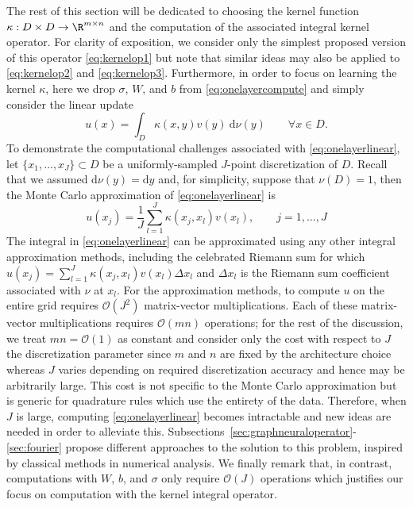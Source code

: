 The rest of this section will be dedicated to choosing the kernel function \(\kappa : D \times D \to \R^{m \times n}\) and the computation of the associated integral kernel operator. For clarity of exposition, we consider only the simplest proposed version of this operator \eqref{eq:kernelop1} but note that similar ideas may also be applied to \eqref{eq:kernelop2} and \eqref{eq:kernelop3}. Furthermore, in order to focus on learning the kernel $\kappa$, here we drop \(\sigma\), \(W\), and \(b\) from \eqref{eq:onelayercompute} and simply consider the linear update
\begin{equation}
    \label{eq:onelayerlinear}
    u(x) = \int_D \kappa(x,y) v(y) \: \text{d} \nu(y) \qquad \forall x \in D.
\end{equation}
To demonstrate the computational challenges associated with \eqref{eq:onelayerlinear}, let \(\{x_1,\dots,x_J\} \subset D\) be a uniformly-sampled \(J\)-point discretization of \(D\). Recall that we assumed \(\text{d} \nu(y) = \text{d} y\) and, for simplicity, suppose that \(\nu(D)=1\), then the Monte Carlo approximation of \eqref{eq:onelayerlinear} is
%
\begin{equation}
    \label{eq:onelayerlinear_MC}
    u(x_j) = \frac{1}{J} \sum_{l=1}^J \kappa(x_j, x_l) v(x_l), \qquad j=1,\dots,J
\end{equation}
The integral in \eqref{eq:onelayerlinear} can be approximated using any other integral approximation methods, including the celebrated Riemann sum for which $u(x_j) = \sum_{l=1}^J \kappa(x_j, x_l) v(x_l)\Delta x_l$ and $\Delta x_l$ is the Riemann sum coefficient associated with $\nu$ at $x_l$. For the approximation methods, to compute \(u\) on the entire grid requires \(\mathcal{O}(J^2)\) matrix-vector multiplications. Each of these matrix-vector multiplications requires \(\mathcal{O}(mn)\) operations; for the rest of the discussion, we treat \(mn = \mathcal{O}(1)\) as constant and consider only the cost with respect to \(J\) the discretization parameter since $m$ and $n$ are fixed by
the architecture choice whereas $J$ varies depending on
required discretization accuracy and hence may be arbitrarily
large. This cost is not specific to the Monte Carlo approximation but is generic for quadrature rules which use the entirety of the data. Therefore, when \(J\) is large, computing \eqref{eq:onelayerlinear} becomes intractable and new ideas are needed in order to alleviate this. Subsections~\ref{sec:graphneuraloperator}-\ref{sec:fourier} propose different approaches to the solution to this problem,
inspired by classical methods in numerical analysis.  We finally remark that, in contrast, computations with \(W\), \(b\), and \(\sigma\) only require \(\mathcal{O}(J)\) operations which justifies our focus on computation with the kernel integral operator.

